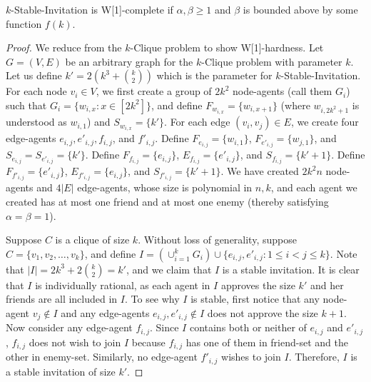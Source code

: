 \begin{theorem} \label{SIP:thm:stable_W1hard_alpha1_beta1}
	$k$-Stable-Invitation is W[1]-complete if $\alpha,\beta \geq 1$ and $\beta$ is bounded above by some function $f(k)$.
\end{theorem}
\begin{proof}
	We reduce from the $k$-Clique problem to show W[1]-hardness. 
	Let $G = (V, E)$ be an arbitrary graph for the $k$-Clique problem with parameter $k$. 
	Let us define $k' = 2(k^3 + \binom{k}{2})$ which is the parameter for $k$-Stable-Invitation. 
	For each node $v_i \in V$, we first create a group of $2k^2$ node-agents (call them $G_i$) such that $G_i=\{w_{i,x}: x \in [2k^2]\}$, and define $F_{w_{i,x}} = \{w_{i,x+1}\}$ (where $w_{i,2k^2+1}$ is understood as $w_{i,1}$) and $S_{w_{i,x}} = \{k'\}$.
	 For each edge $(v_i, v_j) \in E$, we create four edge-agents $e_{i,j}, e'_{i,j}, f_{i,j}$, and $f'_{i,j}$.
	 Define $F_{e_{i,j}} = \{w_{i,1}\}$, $F_{e'_{i,j}} = \{w_{j,1}\}$, and $S_{e_{i,j}} = S_{e'_{i,j}} = \{k'\}$. 
	 Define $F_{f_{i,j}} = \{e_{i,j}\}$, $E_{f_{i,j}} = \{e'_{i,j}\}$, and $S_{f_{i,j}} = \{k'+1\}$.
	 Define $F_{f'_{i,j}} = \{e'_{i,j}\}$, $E_{f'_{i,j}} = \{e_{i,j}\}$, and $S_{f'_{i,j}} = \{k'+1\}$.
	 We have created $2k^2n$ node-agents and $4|E|$ edge-agents, whose size is polynomial in $n,k$, and each agent we created has at most one friend and at most one enemy (thereby satisfying $\alpha=\beta=1$). 

	 Suppose $C$ is a clique of size $k$. Without loss of generality, suppose $C = \{v_1, v_2, \dots, v_k\}$, and define $I = (\cup_{i=1}^{k} G_i)\cup \{e_{i,j}, e'_{i,j}: 1 \leq i < j \leq k\}$. Note that $|I| = 2k^3 + 2 \binom{k}{2} = k'$, and we claim that $I$ is a stable invitation. It is clear that $I$ is individually rational, as each agent in $I$ approves the size $k'$ and her friends are all included in $I$. To see why $I$ is stable, first notice that any node-agent $v_j \not\in I$ and any edge-agents $e_{i,j}, e'_{i,j}\not\in I$ does not approve the size $k+1$. Now consider any edge-agent $f_{i,j}$. Since $I$ contains both or neither of $e_{i,j}$ and $e'_{i,j}$, $f_{i,j}$ does not wish to join $I$ because $f_{i,j}$ has one of them in friend-set and the other in enemy-set. Similarly, no edge-agent $f'_{i,j}$ wishes to join $I$. Therefore, $I$ is a stable invitation of size $k'$. 
	 

\end{proof}
